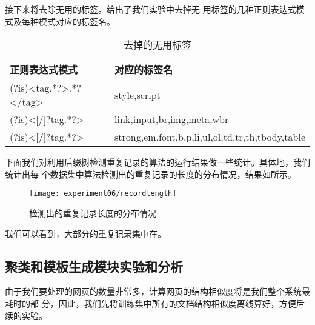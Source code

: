 接下来将去除无用的标签。给出了我们实验中去掉无
用标签的几种正则表达式模式及每种模式对应的标签名。
\begin{table}[hb]
  \centering
\begin{tabular}{ll}
  \toprule
正则表达式模式 & 对应的标签名 \\
\hline
(?is)<tag.*?>.*?</tag> & style,script \\
(?is)<[/]?tag.*?> & link,input,br,img,meta,wbr \\
(?is)<[/]?tag.*?> & strong,em,font,b,p,li,ul,ol,td,tr,th,tbody,table \\
\bottomrule
\end{tabular}
  \caption{去掉的无用标签}
  \label{experiment:tab:uselesstags}
\end{table}
\begin{comment}
#+ORGTBL: SEND 无用标签 orgtbl-to-latex :splice nil :skip 0
| 正则表达式模式         | 对应的标签名                                     |
|------------------------+--------------------------------------------------|
| (?is)<tag.*?>.*?</tag> | style,script                                     |
| (?is)<[/]?tag.*?>      | link,input,br,img,meta,wbr                       |
| (?is)<[/]?tag.*?>      | strong,em,font,b,p,li,ul,ol,td,tr,th,tbody,table |
\end{comment}

下面我们对利用后缀树检测重复记录的算法的运行结果做一些统计。具体地，我们统计出每
个数据集中算法检测出的重复记录的长度的分布情况，结果如所示。%
\begin{figure}[hb]
  \centering
  \texttt{[image: experiment06/recordlength]}
  \caption{检测出的重复记录长度的分布情况}
  \label{experiment:fig:recordlength}
\end{figure}

我们可以看到，大部分的重复记录集中在。%

\subsection{聚类和模板生成模块实验和分析}
由于我们要处理的网页的数量非常多，计算网页的结构相似度将是我们整个系统最耗时的部
分，因此，我们先将训练集中所有的文档结构相似度离线算好，方便后续的实验。


